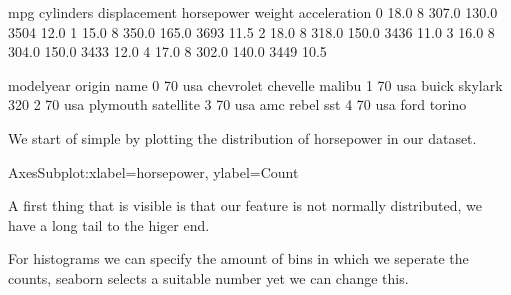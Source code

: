 \documentclass[letterpaper,10pt,english]{jupyterBook}
\begin{document}
\begin{sphinxVerbatim}[commandchars=\\\{\}]
    mpg  cylinders  displacement  horsepower  weight  acceleration  \PYGZbs{}
0  18.0          8         307.0       130.0    3504          12.0   
1  15.0          8         350.0       165.0    3693          11.5   
2  18.0          8         318.0       150.0    3436          11.0   
3  16.0          8         304.0       150.0    3433          12.0   
4  17.0          8         302.0       140.0    3449          10.5   

   model\PYGZus{}year origin                       name  
0          70    usa  chevrolet chevelle malibu  
1          70    usa          buick skylark 320  
2          70    usa         plymouth satellite  
3          70    usa              amc rebel sst  
4          70    usa                ford torino  
\end{sphinxVerbatim}

\sphinxAtStartPar
We start of simple by plotting the distribution of horsepower in our dataset.

\begin{sphinxVerbatim}[commandchars=\\\{\}]
 
\end{sphinxVerbatim}

\begin{sphinxVerbatim}[commandchars=\\\{\}]
\PYGZlt{}AxesSubplot:xlabel=\PYGZsq{}horsepower\PYGZsq{}, ylabel=\PYGZsq{}Count\PYGZsq{}\PYGZgt{}
\end{sphinxVerbatim}

\noindent{}

\sphinxAtStartPar
A first thing that is visible is that our feature is not normally distributed, we have a long tail to the higer end.

\sphinxAtStartPar
For histograms we can specify the amount of bins in which we seperate the counts, seaborn selects a suitable number yet we can change this.

\begin{sphinxVerbatim}[commandchars=\\\{\}]
  
\end{sphinxVerbatim}
\end{document}
